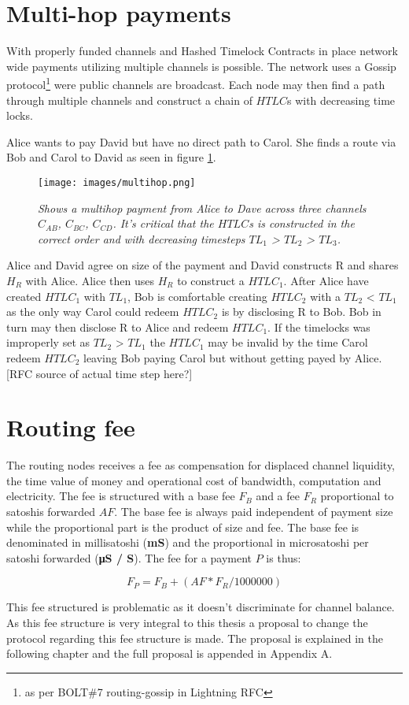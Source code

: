 \section{Multi-hop payments} 

With properly funded channels and Hashed Timelock Contracts in place network wide payments utilizing multiple channels is possible.
The network uses a Gossip protocol\footnote{as per BOLT\#7 routing-gossip in Lightning RFC\cite{repository:lightning:rfc}} were
public channels are broadcast. Each node may then find a path through multiple channels and construct a chain of $HTLC$s with decreasing time locks.

Alice wants to pay David but have no direct path to Carol. She finds a route via Bob and Carol to David as seen in figure \ref{fig:multihop}.

\begin{figure}[!htb]

	\centering
	\texttt{[image: images/multihop.png]}

	\caption{\textit{
			Shows a multihop payment from Alice to Dave across three channels $C_{AB}$, $C_{BC}$, $C_{CD}$. It's critical that the $HTLC$s is constructed in the correct order and with decreasing timesteps $TL_{1}$ > $TL_{2}$ > $TL_{3}$.
		}}
	\label{fig:multihop}

\end{figure}

Alice and David agree on size of the payment and David constructs R and shares $H_{R}$ with Alice. Alice then uses $H_{R}$ to construct a $HTLC_{1}$.
After Alice have created $HTLC_{1}$ with $TL_{1}$, Bob is comfortable creating $HTLC_{2}$ with a $TL_{2}$ < $TL_{1}$ as the only way Carol could redeem $HTLC_{2}$ is by disclosing R to Bob. Bob in turn may then disclose R to Alice and redeem $HTLC_{1}$. If the timelocks was improperly set as $TL_{2}$ > $TL_{1}$ the $HTLC_{1}$ may be invalid by the time Carol redeem $HTLC_{2}$ leaving Bob paying Carol but without getting payed by Alice. [RFC source of actual time step here?]

\section{Routing fee}

The routing nodes receives a fee as compensation for displaced channel liquidity, the time value of money and operational cost of bandwidth, computation and electricity. The fee is structured with a base fee $F_{B}$ and a fee $F_{R}$ proportional to satoshis forwarded $AF$. The base fee is always paid independent of payment size while the proportional part is the product of size and fee. The base fee is denominated in millisatoshi (\textbf{mS}) and the proportional in microsatoshi per satoshi forwarded (\textbf{μS / S}). The fee for a payment $P$ is thus:

\[ F_{P} = F_{B} + (AF * F_{R} / 1000000) \]

This fee structured is problematic as it doesn't discriminate for channel balance. As this fee structure is very integral to this thesis a proposal to change the protocol regarding this fee structure is made. The proposal is explained in the following chapter and the full proposal is appended in Appendix A. 
